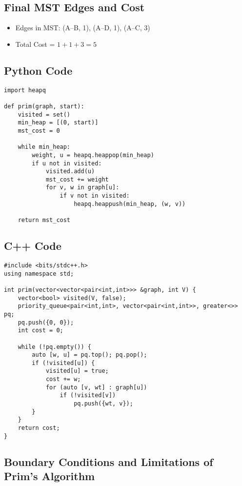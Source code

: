 \documentclass[a4paper,14pt]{extarticle}
\begin{document}
\subsection*{Final MST Edges and Cost}

\begin{itemize}
    \item Edges in MST: (A–B, 1), (A–D, 1), (A–C, 3)
    \item Total Cost = $1 + 1 + 3 = 5$
\end{itemize}

\newpage
\subsection{Python Code}
\begin{lstlisting}[style=python, caption={Prim's Algorithm in Python}]
import heapq

def prim(graph, start):
    visited = set()
    min_heap = [(0, start)]
    mst_cost = 0

    while min_heap:
        weight, u = heapq.heappop(min_heap)
        if u not in visited:
            visited.add(u)
            mst_cost += weight
            for v, w in graph[u]:
                if v not in visited:
                    heapq.heappush(min_heap, (w, v))

    return mst_cost
\end{lstlisting}

\subsection{C++ Code}
\begin{lstlisting}[style=cpp, caption={Prim's Algorithm in C++}]
#include <bits/stdc++.h>
using namespace std;

int prim(vector<vector<pair<int,int>>> &graph, int V) {
    vector<bool> visited(V, false);
    priority_queue<pair<int,int>, vector<pair<int,int>>, greater<>> pq;
    pq.push({0, 0});
    int cost = 0;

    while (!pq.empty()) {
        auto [w, u] = pq.top(); pq.pop();
        if (!visited[u]) {
            visited[u] = true;
            cost += w;
            for (auto [v, wt] : graph[u])
                if (!visited[v])
                    pq.push({wt, v});
        }
    }
    return cost;
}
\end{lstlisting}

\subsection{Boundary Conditions and Limitations of Prim's Algorithm}
\end{document}
